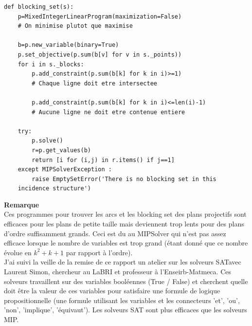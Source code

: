 \documentclass[a4paper]{article}
\begin{document}
\begin{lstlisting}
def blocking_set(s):
    p=MixedIntegerLinearProgram(maximization=False)
    # On minimise plutot que maximise 

    b=p.new_variable(binary=True)
    p.set_objective(p.sum(b[v] for v in s._points))
    for i in s._blocks:
        p.add_constraint(p.sum(b[k] for k in i)>=1)
        # Chaque ligne doit etre intersectee 

        p.add_constraint(p.sum(b[k] for k in i)<=len(i)-1)
        # Aucune ligne ne doit etre contenue entiere 
        
    try:
        p.solve()
        r=p.get_values(b)
        return [i for (i,j) in r.items() if j==1]
    except MIPSolverException :
        raise EmptySetError('There is no blocking set in this
    incidence structure')  
\end{lstlisting}
\vspace{1\baselineskip}

\textbf{Remarque}\\
Ces programmes pour trouver les arcs et les blocking set des plans projectifs sont efficaces pour les plans de petite taille mais deviennent trop lents pour des plans d'ordre suffisamment grands. Ceci est du au MIPSolver qui n'est pas assez efficace lorsque le nombre de variables est trop grand (étant donné que ce nombre évolue en $k^2 + k + 1$ par rapport à l'ordre).\\
J'ai suivi la veille de la remise de ce rapport un atelier sur les solveurs SATavec Laurent Simon, chercheur au LaBRI et professeur à l'Enseirb-Matmeca. Ces solveurs travaillent sur des variables booléennes (True / False) et cherchent quelle doit être la valeur de ces variables pour satisfaire une formule de logique propositionnelle (une formule utilisant les variables et les connecteurs 'et', 'ou', 'non', 'implique', 'équivaut'). Les solveurs SAT sont plus efficaces que les solveurs MIP.
\newpage
\end{document}
